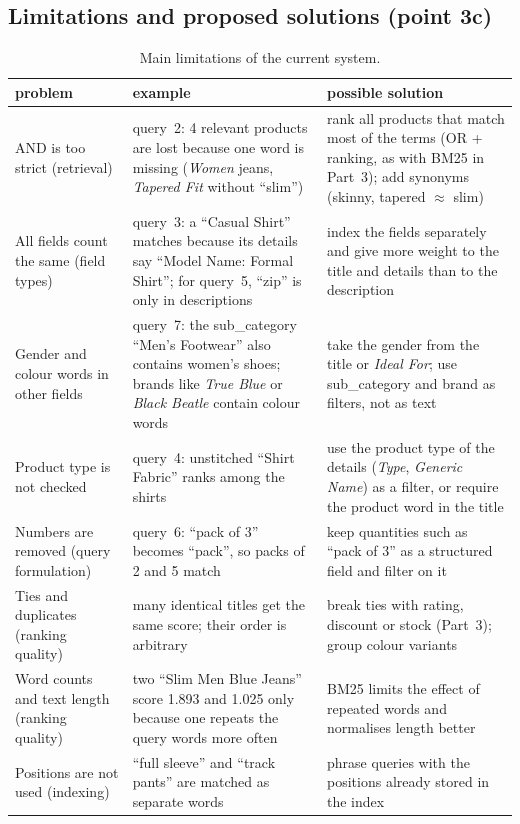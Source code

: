 \documentclass[11pt,a4paper]{article}
\begin{document}
\subsection{Limitations and proposed solutions (point 3c)}
\begin{table}[H]
\centering\small
\begin{tabularx}{\textwidth}{@{}>{\raggedright\arraybackslash}p{3.2cm} Y Y@{}}
\toprule
problem & example & possible solution\\
\midrule
AND is too strict (retrieval) & query~2: 4 relevant products are lost because one word is missing (\emph{Women}
jeans, \emph{Tapered Fit} without ``slim'') & rank all products that match most of the terms (OR + ranking, as with
BM25 in Part~3); add synonyms (skinny, tapered $\approx$ slim)\\
All fields count the same (field types) & query~3: a ``Casual Shirt'' matches because its details say ``Model Name:
Formal Shirt''; for query~5, ``zip'' is only in descriptions & index the fields separately and give more weight to the
title and details than to the description\\
Gender and colour words in other fields & query~7: the sub\_category ``Men's Footwear'' also contains women's shoes;
brands like \emph{True Blue} or \emph{Black Beatle} contain colour words & take the gender from the title or
\emph{Ideal For}; use sub\_category and brand as filters, not as text\\
Product type is not checked & query~4: unstitched ``Shirt Fabric'' ranks among the shirts & use the product type of
the details (\emph{Type}, \emph{Generic Name}) as a filter, or require the product word in the title\\
Numbers are removed (query formulation) & query~6: ``pack of 3'' becomes ``pack'', so packs of 2 and 5 match & keep
quantities such as ``pack of 3'' as a structured field and filter on it\\
Ties and duplicates (ranking quality) & many identical titles get the same score; their order is arbitrary & break ties
with rating, discount or stock (Part~3); group colour variants\\
Word counts and text length (ranking quality) & two ``Slim Men Blue Jeans'' score 1.893 and 1.025 only because one
repeats the query words more often & BM25 limits the effect of repeated words and normalises length
better\\
Positions are not used (indexing) & ``full sleeve'' and ``track pants'' are matched as separate words & phrase queries
with the positions already stored in the index\\
\bottomrule
\end{tabularx}
\caption{Main limitations of the current system.}
\end{table}
\end{document}
